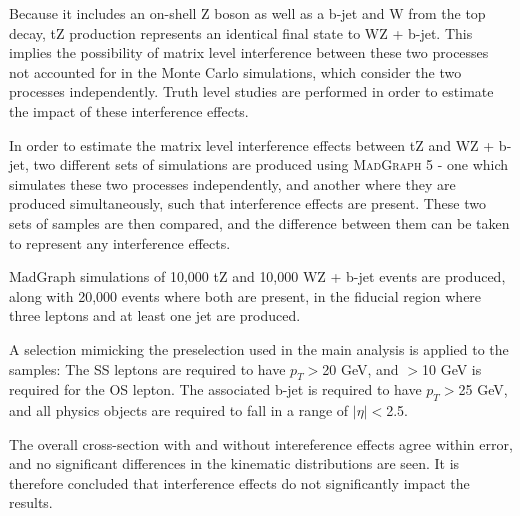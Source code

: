
Because it includes an on-shell Z boson as well as a b-jet and W from the top decay, tZ production represents an identical final state  to WZ + b-jet. This implies the possibility of matrix level interference between these two processes not accounted for in the Monte Carlo simulations, which consider the two processes independently. Truth level studies are performed in order to estimate the impact of these interference effects.    

In order to estimate the matrix level interference effects between tZ and WZ + b-jet, two different sets of simulations are produced using \textsc{MadGraph} 5 \cite{Madgraph} - one which simulates these two processes independently, and another where they are  produced simultaneously, such that interference effects are present. These two sets of samples are then compared, and the difference between them can be taken to represent any interference effects.

MadGraph simulations of 10,000 tZ and 10,000 WZ + b-jet events are produced, along with 20,000 events where both are present, in the fiducial region where three leptons and at least one jet are produced.  

A selection mimicking the preselection used in the main analysis is applied to the samples: The SS leptons are required to have $p_T>$20 GeV, and $>$10 GeV is required for the OS lepton. The associated b-jet is required to have $p_T>$25 GeV, and all physics objects are required to fall in a range of $|\eta|<$2.5. 



The overall cross-section with and without intereference effects agree within error, and no significant differences in the kinematic distributions are seen. It is therefore concluded that interference effects do not significantly impact the results.
